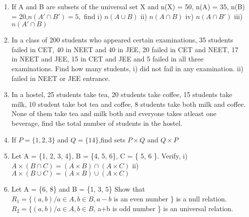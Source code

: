 \documentclass[14pt]{article}
\begin{document}
\begin{multicols}{2}
\begin{enumerate}[resume]
\item If A and B are subsets of the universal set X and n(X) = 50, n(A) = 35, n(B) = 20,$ n(A'\cap B') = 5,$ find i) $n (A\cup B)$ ii) $n(A\cap B)$
iv) $ n(A\cap B')$
iii) $ n(A'\cap B) $

\item In a class of 200 students who appeared
certain examinations, 35 students failed
in CET, 40 in NEET and 40 in JEE,
20 failed in CET and NEET, 17 in NEET
and JEE, 15 in CET and JEE and 5 failed
in all three examinations. Find how many
students,
i)	did not fail in any examination.
ii) failed in NEET or JEE entrance.
		 
		 
\item In a hostel, 25 students take tea, 20 students
take coffee, 15 students take milk, 10
student take bot tea and coffee, 8 students
take both milk and coffee. None of them
take tea and milk both and everyone takes
atleast one beverage, find the total number
of students in the hostel.

\item If $P = \{1, 2, 3 \} $ and $Q = \{14 \}$,find sets $P \times Q $ and $Q \times P$

\item Let A = \{1, 2, 3, 4\}, B = \{4, 5, 6\}, C = \{ 5, 6 \}.
 Verify, i) $A \times (B \cap C) = (A \times B) \cap (A \times C)$				
ii) $ A \times (B \cup C) = (A \times B) \cup (A \times C)$

\item Let A = \{6, 8\} and B = \{1, 3, 5\} Show that $ R_1 = \{ (a, b) / a \in A, b\in B, a - b$
is an even number \} is a null relation.
$R_2 = \{(a, b)/a \in A, b \in B$, a+b is odd number \}
is an universal relation.
\end{enumerate} 





\end{multicols}
 
\end{document}
